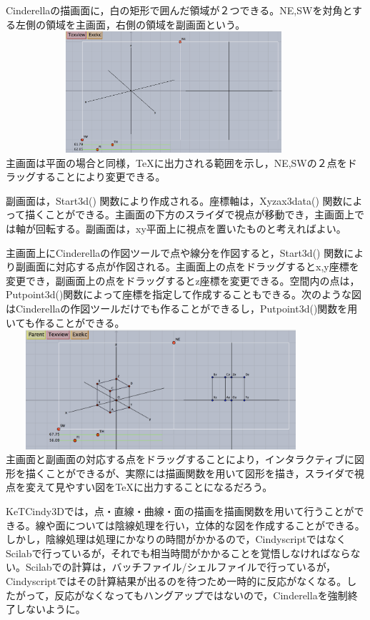 \documentclass[papersize,a4paper,12pt,uplatex]{jsarticle}
\begin{document}
Cinderellaの描画面に，白の矩形で囲んだ領域が２つできる。NE,SWを対角とする左側の領域を主画面，右側の領域を副画面という。\\

　　　　　　\includegraphics[bb=0 0 1776 998 , width=8cm]{Fig3d/3dstart.png}\\

主画面は平面の場合と同様，TeXに出力される範囲を示し，NE,SWの２点をドラッグすることにより変更できる。

副画面は，Start3d() 関数により作成される。座標軸は，Xyzax3data() 関数によって描くことができる。主画面の下方のスライダで視点が移動でき，主画面上では軸が回転する。副画面は，xy平面上に視点を置いたものと考えればよい。

主画面上にCinderellaの作図ツールで点や線分を作図すると，Start3d() 関数により副画面に対応する点が作図される。主画面上の点をドラッグするとx,y座標を変更でき，副画面上の点をドラッグするとz座標を変更できる。空間内の点は，Putpoint3d()関数によって座標を指定して作成することもできる。次のような図はCinderellaの作図ツールだけでも作ることができるし，Putpoint3d()関数を用いても作ることができる。\\

　　\includegraphics[bb=0 0 1892 840 , width=10cm]{Fig3d/3dscreen.png}\\

主画面と副画面の対応する点をドラッグすることにより，インタラクティブに図形を描くことができるが、実際には描画関数を用いて図形を描き，スライダで視点を変えて見やすい図をTeXに出力することになるだろう。

KeTCindy3Dでは，点・直線・曲線・面の描画を描画関数を用いて行うことができる。線や面については陰線処理を行い，立体的な図を作成することができる。しかし，陰線処理は処理にかなりの時間がかかるので，CindyscriptではなくScilabで行っているが，それでも相当時間がかかることを覚悟しなければならない。Scilabでの計算は，バッチファイル/シェルファイルで行っているが，Cindyscriptではその計算結果が出るのを待つため一時的に反応がなくなる。したがって，反応がなくなってもハングアップではないので，Cinderellaを強制終了しないように。
\end{document}
